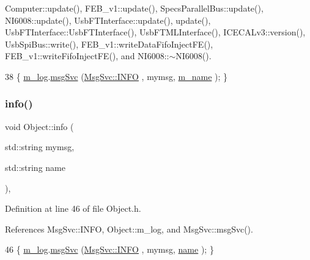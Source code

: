Computer\+::update(), F\+E\+B\+\_\+v1\+::update(), Specs\+Parallel\+Bus\+::update(), N\+I6008\+::update(), Usb\+F\+T\+Interface\+::update(), update(), Usb\+F\+T\+Interface\+::\+Usb\+F\+T\+Interface(), Usb\+F\+T\+M\+L\+Interface(), I\+C\+E\+C\+A\+Lv3\+::version(), Usb\+Spi\+Bus\+::write(), F\+E\+B\+\_\+v1\+::write\+Data\+Fifo\+Inject\+F\+E(), F\+E\+B\+\_\+v1\+::write\+Fifo\+Inject\+F\+E(), and N\+I6008\+::$\sim$\+N\+I6008().


\begin{DoxyCode}
38 \{ \hyperlink{classObject_a0d269813dd7ac1f24bc143031e2963f2}{m\_log}.\hyperlink{classMsgSvc_ad25f18047920cc59a314e5098259711c}{msgSvc} (\hyperlink{classMsgSvc_ae671eb7301996cd049d2da8a65925926ad2fcf3f3e734fc41ee097cc23670ce51}{MsgSvc::INFO}    , mymsg, \hyperlink{classObject_a8b83c95c705d2c3ba0d081fe1710f48d}{m\_name} ); \}
\end{DoxyCode}
\mbox{\label{classObject_a1ca123253dfd30fc28b156f521dcbdae}} 
\subsubsection{\texorpdfstring{info()}{info()}\hspace{0.1cm}{\footnotesize\ttfamily [2/2]}}
{\footnotesize\ttfamily void Object\+::info (\begin{DoxyParamCaption}\item[{std\+::string}]{mymsg,  }\item[{std\+::string}]{name }\end{DoxyParamCaption})\hspace{0.3cm}{\ttfamily [inline]}, {\ttfamily [inherited]}}



Definition at line 46 of file Object.\+h.



References Msg\+Svc\+::\+I\+N\+FO, Object\+::m\+\_\+log, and Msg\+Svc\+::msg\+Svc().


\begin{DoxyCode}
46 \{ \hyperlink{classObject_a0d269813dd7ac1f24bc143031e2963f2}{m\_log}.\hyperlink{classMsgSvc_ad25f18047920cc59a314e5098259711c}{msgSvc} (\hyperlink{classMsgSvc_ae671eb7301996cd049d2da8a65925926ad2fcf3f3e734fc41ee097cc23670ce51}{MsgSvc::INFO}    , mymsg, \hyperlink{classObject_a300f4c05dd468c7bb8b3c968868443c1}{name} ); \}
\end{DoxyCode}
\mbox{\label{classUsbFTMLInterface_a7f7c96ece97e607b88425823a2923a43}} 
